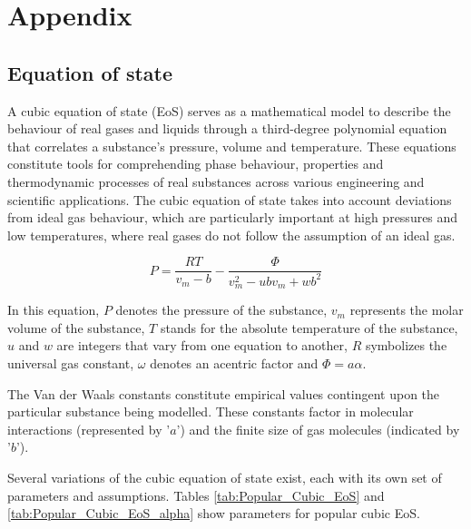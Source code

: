 \documentclass[a4paper,fleqn]{cas-dc}
\begin{document}
\section{Appendix} 

\label{CH: Thermodynamic_details}

\subsection{Equation of state} \label{subsubsec: Equation of state}

A cubic equation of state (EoS) serves as a mathematical model to describe the behaviour of real gases and liquids through a third-degree polynomial equation that correlates a substance's pressure, volume and temperature. These equations constitute tools for comprehending phase behaviour, properties and thermodynamic processes of real substances across various engineering and scientific applications. The cubic equation of state takes into account deviations from ideal gas behaviour, which are particularly important at high pressures and low temperatures, where real gases do not follow the assumption of an ideal gas.

{\footnotesize
	\begin{equation}
		P = \frac{RT}{v_m-b} - \frac{\Phi}{v_m^2 - ubv_m + wb^2}
	\end{equation}
}

In this equation, $P$ denotes the pressure of the substance, $v_m$ represents the molar volume of the substance, $T$ stands for the absolute temperature of the substance, $u$ and $w$ are integers that vary from one equation to another, $R$ symbolizes the universal gas constant, $\omega$ denotes an acentric factor and $\Phi=a\alpha$.

The Van der Waals constants constitute empirical values contingent upon the particular substance being modelled. These constants factor in molecular interactions (represented by '$a$') and the finite size of gas molecules (indicated by '$b$'). 

Several variations of the cubic equation of state exist, each with its own set of parameters and assumptions. Tables \ref{tab:Popular_Cubic_EoS} and \ref{tab:Popular_Cubic_EoS_alpha} show parameters for popular cubic EoS.
\end{document}
